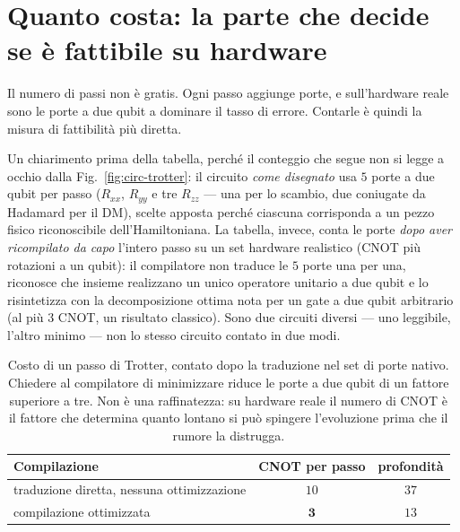 \documentclass[11pt,a4paper]{article}
\begin{document}
\section{Quanto costa: la parte che decide se è fattibile su hardware}

Il numero di passi non è gratis. Ogni passo aggiunge porte, e sull'hardware
reale sono le porte a due qubit a dominare il tasso di errore. Contarle è quindi
la misura di fattibilità più diretta.

Un chiarimento prima della tabella, perché il conteggio che segue non si legge
a occhio dalla Fig.~\ref{fig:circ-trotter}: il circuito \emph{come disegnato} usa $5$
porte a due qubit per passo ($R_{xx}$, $R_{yy}$ e tre $R_{zz}$ --- una per lo
scambio, due coniugate da Hadamard per il DM), scelte apposta perché ciascuna
corrisponda a un pezzo fisico riconoscibile dell'Hamiltoniana. La tabella,
invece, conta le porte \emph{dopo aver ricompilato da capo} l'intero passo su
un set hardware realistico (CNOT più rotazioni a un qubit): il compilatore non
traduce le $5$ porte una per una, riconosce che insieme realizzano un unico
operatore unitario a due qubit e lo risintetizza con la decomposizione ottima
nota per un gate a due qubit arbitrario (al più $3$ CNOT, un risultato
classico). Sono due circuiti diversi --- uno leggibile, l'altro minimo --- non
lo stesso circuito contato in due modi.

\begin{table}[htbp]
\centering
\small
\renewcommand{\arraystretch}{1.3}
\begin{tabular}{@{}lcc@{}}
\toprule
\rowcolor{grigetto}
\textbf{Compilazione} & \textbf{CNOT per passo} & \textbf{profondità} \\
\midrule
traduzione diretta, nessuna ottimizzazione & $10$ & $37$ \\
compilazione ottimizzata & $\mathbf{3}$ & $13$ \\
\bottomrule
\end{tabular}
\caption{Costo di un passo di Trotter, contato dopo la traduzione nel set di
porte nativo. Chiedere al compilatore di minimizzare riduce le porte a due
qubit di un fattore superiore a tre. Non è una raffinatezza: su hardware reale
il numero di CNOT è il fattore che determina quanto lontano si può spingere
l'evoluzione prima che il rumore la distrugga.}
\end{table}

\FloatBarrier

\end{document}

